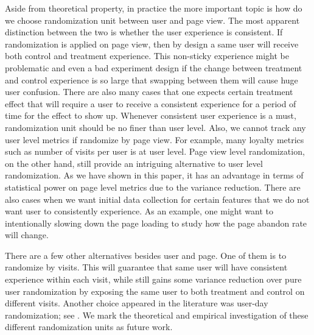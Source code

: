 \documentclass[11pt]{asaproc}
\newcommand{\ci}{\citeasnoun}
\begin{document}
Aside from theoretical property, in practice the more important topic is how do we choose randomization unit between user and page view. The most apparent distinction between the two is whether the user experience is consistent. If randomization is applied on page view, then by design a same user will receive both control and treatment experience.  This non-sticky experience might be problematic and even a bad experiment design if the change between treatment and control experience is so large that swapping between them will cause huge user confusion. There are also many cases that one expects certain treatment effect that will require a user to receive a consistent experience for a period of time for the effect to show up. Whenever consistent user experience is a must, randomization unit should be no finer than user level. Also, we cannot track any user level metrics if randomize by page view. For example, many loyalty metrics such as number of visits per user is at user level.  Page view level randomization, on the other hand, still provide an intriguing alternative to user level randomization. As we have shown in this paper, it has an advantage in terms of statistical power on page level metrics due to the variance reduction. There are also cases when we want initial data collection for certain features that we do not want user to consistently experience. As an example, one might want to intentionally slowing down the page loading to study how the page abandon rate will change. 

There are a few other alternatives besides user and page. One of them is to randomize by visits. This will guarantee that same user will have consistent experience within each visit, while still gains some variance reduction over pure user randomization by exposing the same user to both treatment and control on different visits. Another choice appeared in the literature was user-day randomization; see \ci{googlesurvey}. We mark the theoretical and empirical investigation of these different randomization units as future work. 



\nocite{googlesurvey} 
\nocite{asympstat}



\end{document}
